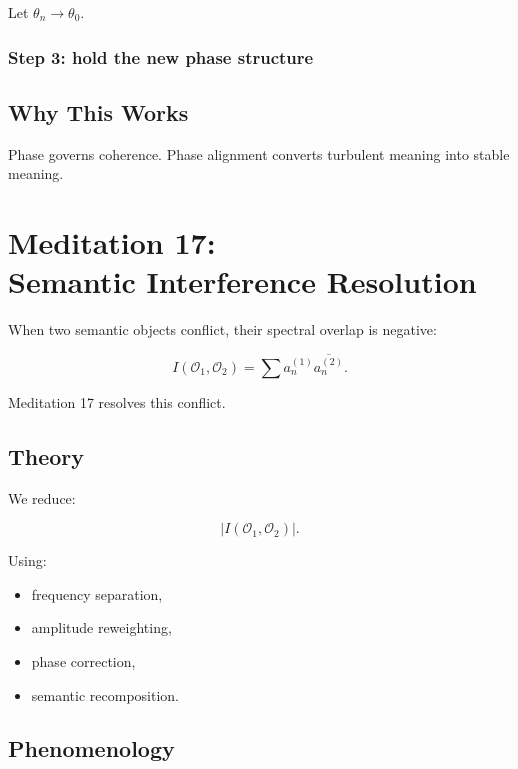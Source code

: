 \documentclass[12pt]{article}
\begin{document}
Let $\theta_n \to \theta_0$.

\subsection*{Step 3: hold the new phase structure}

\section{Why This Works}

Phase governs coherence.  
Phase alignment converts turbulent meaning into stable meaning.

\newpage


\chapter{Meditation 17:\\ Semantic Interference Resolution}

When two semantic objects conflict, their spectral overlap is negative:

\[
I(\mathcal{O}_1,\mathcal{O}_2)
    = \sum a_n^{(1)} \overline{a_n^{(2)}}.
\]

Meditation 17 resolves this conflict.

\section{Theory}

We reduce:

\[
|I(\mathcal{O}_1,\mathcal{O}_2)|.
\]

Using:

\begin{itemize}
    \item frequency separation,
    \item amplitude reweighting,
    \item phase correction,
    \item semantic recomposition.
\end{itemize}

\section{Phenomenology}
\end{document}
